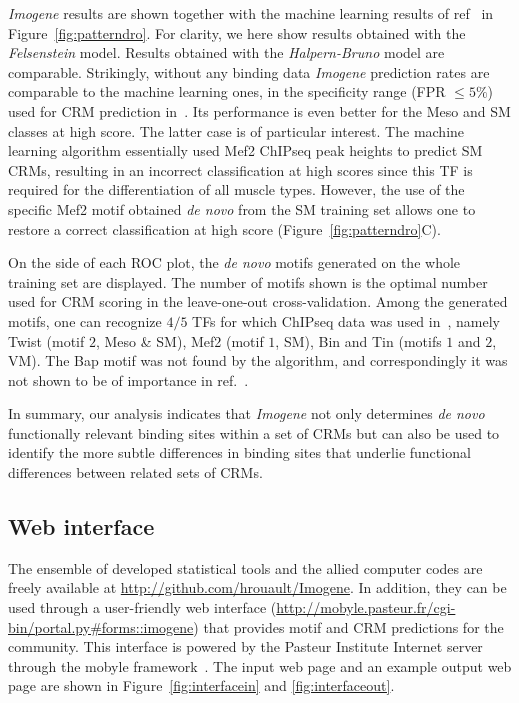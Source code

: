 \documentclass[a4,center,fleqn]{NAR}
\begin{document}
{\em Imogene} results are shown  together with the machine learning results of
ref~\cite{pmid19890324} in Figure~\ref{fig:patterndro}.
For clarity, we here show results obtained with the {\em Felsenstein} model.
Results obtained with the {\em Halpern-Bruno} model are comparable.
Strikingly, without any binding data {\em Imogene} prediction rates are 
comparable to the machine learning ones, in the  specificity range (FPR
$\leq 5\%$) used for CRM prediction in~\cite{pmid19890324}.
Its performance is even better for the Meso and SM classes at high score. 
The latter case is of particular interest. 
The machine learning algorithm essentially used Mef2 ChIPseq peak heights to
predict SM CRMs, resulting in an incorrect classification at high scores since
this TF is required for the differentiation of all muscle types. 
However, the use of the specific Mef2 motif obtained \textit{de novo} from the
SM training set allows one to restore a correct classification at high score
(Figure~\ref{fig:patterndro}C).

On the side of each ROC plot,  the \textit{de novo} motifs generated on
the whole training set are displayed. 
The number of motifs shown is the optimal number used for CRM scoring in the
leave-one-out cross-validation. 
Among the generated motifs, one can recognize $4/5$ TFs for which ChIPseq data
was used in~\cite{pmid19890324}, namely Twist (motif $2$, Meso \& SM), Mef2
(motif $1$, SM),  Bin and Tin (motifs $1$ and $2$, VM). 
The Bap motif was not found by the algorithm, and correspondingly it was not
shown to be of importance in ref.~\cite{pmid19890324}.
 
 In summary, our analysis indicates that {\em Imogene} not only determines
 {\em de novo} functionally relevant binding sites within a set of CRMs but can
 also be used to identify the more subtle differences in binding sites that
 underlie functional differences between related sets of CRMs.
 
\subsection*{Web interface}
The ensemble of developed statistical tools and the allied computer codes are
freely available at \url{http://github.com/hrouault/Imogene}.
In addition, they can be used through a user-friendly web interface
(\url{http://mobyle.pasteur.fr/cgi-bin/portal.py#forms::imogene}) that provides
motif and CRM predictions for the community.
This interface is powered by the Pasteur Institute Internet server through the
mobyle framework~\cite{pmid19689959}.
The input web page and an example output web page are shown in
Figure~\ref{fig:interfacein} and \ref{fig:interfaceout}.
\end{document}
